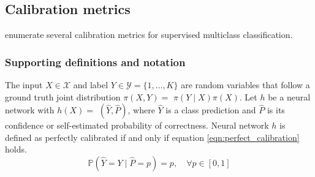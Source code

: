 \subsection{Calibration metrics}
\cite{guo2017calibration} enumerate several calibration metrics for supervised multiclass classification.

\subsubsection{Supporting definitions and notation}
The input $X \in \mathcal{X}$ and label $Y \in \mathcal{Y}=\{1, \ldots, K\}$ are random variables that follow a ground truth joint distribution $\pi(X, Y)=$ $\pi(Y \mid X) \pi(X)$. Let $h$ be a neural network with $h(X)=$ $(\hat{Y}, \hat{P})$, where $\hat{Y}$ is a class prediction and $\hat{P}$ is its confidence or self-estimated probability of correctness. Neural network $h$ is defined as perfectly calibrated if and only if equation \ref{eqn:perfect_calibration} holds.
\begin{equation}
  \label{eqn:perfect_calibration}
  \mathbb{P}(\hat{Y}=Y \mid \hat{P}=p)=p, \quad \forall p \in[0,1]
\end{equation}



